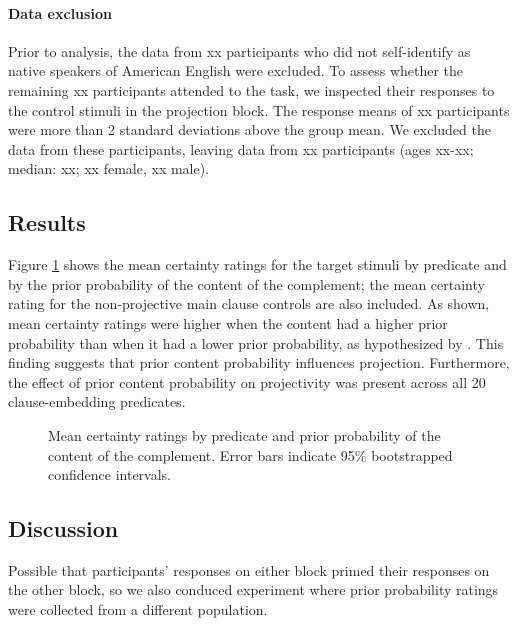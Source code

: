 \documentclass[11pt,fleqn]{article}
\newcommand{\6}{\mbox{$[\hspace*{-.6mm}[$}}
\newcommand{\9}{\mbox{$]\hspace*{-.6mm}]$}}
\begin{document}
\paragraph{Data exclusion} Prior to analysis, the data from xx participants who did not self-identify as native speakers of American English were excluded. To assess whether the remaining xx participants attended to the task, we inspected their responses to the control stimuli in the projection block. The response means of xx participants were more than 2 standard deviations above the group mean. We excluded the data from these participants, leaving data from xx participants (ages xx-xx; median: xx; xx female, xx male).

\subsection{Results}

Figure \ref{f-projection} shows the mean certainty ratings for the target stimuli by predicate and by the prior probability of the content of the complement; the mean certainty rating for the non-projective main clause controls are also included. As shown, mean certainty ratings were higher when the content had a higher prior probability than when it had a lower prior probability, as hypothesized by \citet{tbd-variability}. This finding suggests that prior content probability influences projection. Furthermore, the effect of prior content probability on projectivity was present across all 20 clause-embedding predicates.

\begin{figure}[H]
\centering


\caption{Mean certainty ratings by predicate and prior probability of the content of the complement. Error bars indicate 95\% bootstrapped confidence intervals.} 
\label{f-projection}
\end{figure}

\subsection{Discussion}

Possible that participants' responses on either block primed their responses on the other block, so we also conduced experiment where prior probability ratings were collected from a different population.
\end{document}
